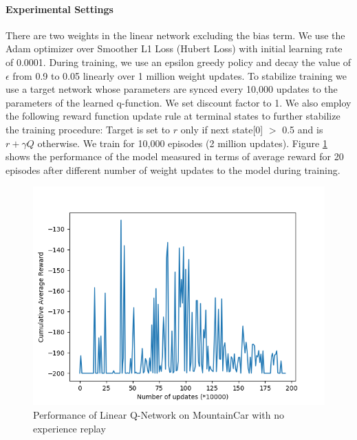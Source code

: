 \documentclass[12pt]{article}
\begin{document}
\paragraph{Experimental Settings} There are two weights in the linear network excluding the bias term. We use the Adam optimizer over Smoother L1 Loss (Hubert Loss) with initial learning rate of 0.0001. During training, we use an epsilon greedy policy and decay the value of $\epsilon$ from 0.9 to 0.05 linearly over 1 million weight updates. To stabilize training we use a target network whose parameters are synced every 10,000 updates to the parameters of the learned q-function. We set discount factor to 1. We also employ the following reward function update rule at terminal states to further stabilize the training procedure:  Target is set to $r$ only if next state[0] $>$ 0.5 and is $r+γQ$ otherwise. We train for 10,000 episodes (2 million updates). Figure \ref{fig:mn02} shows the performance of the model measured in terms of average reward for 20 episodes after different number of weight updates to the model during training.\\

\begin{figure}[h]
  \centering
  \vspace{-5mm}
  \includegraphics[width=0.8\linewidth]{figures/linear_noexp_hubert_target_reward_plot.png}
  \caption{Performance of Linear Q-Network on MountainCar with no experience replay}
  \label{fig:mn02}
\end{figure}
\end{document}
